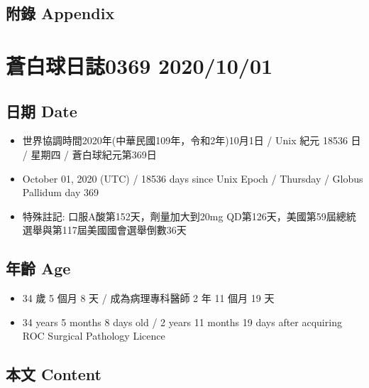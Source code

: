 \documentclass[a5paper, 11pt
]{book}
\providecommand{\tightlist}{%
  \setlength{\itemsep}{0pt}\setlength{\parskip}{0pt}}
\begin{document}
\hypertarget{ux9644ux9304-appendix-27}{%
\subsection{附錄 Appendix}\label{ux9644ux9304-appendix-27}}

\hypertarget{ux84bcux767dux7403ux65e5ux8a8c0369-20201001}{%
\section{蒼白球日誌0369
2020/10/01}\label{ux84bcux767dux7403ux65e5ux8a8c0369-20201001}}

\hypertarget{ux65e5ux671f-date-28}{%
\subsection{日期 Date}\label{ux65e5ux671f-date-28}}

\begin{itemize}
\tightlist
\item
  世界協調時間2020年(中華民國109年，令和2年)10月1日 / Unix 紀元 18536 日
  / 星期四 / 蒼白球紀元第369日
\item
  October 01, 2020 (UTC) / 18536 days since Unix Epoch / Thursday /
  Globus Pallidum day 369
\item
  特殊註記: 口服A酸第152天，劑量加大到20mg
  QD第126天，美國第59屆總統選舉與第117屆美國國會選舉倒數36天
\end{itemize}

\hypertarget{ux5e74ux9f61-age-28}{%
\subsection{年齡 Age}\label{ux5e74ux9f61-age-28}}

\begin{itemize}
\tightlist
\item
  34 歲 5 個月 8 天 / 成為病理專科醫師 2 年 11 個月 19 天
\item
  34 years 5 months 8 days old / 2 years 11 months 19 days after
  acquiring ROC Surgical Pathology Licence
\end{itemize}

\hypertarget{ux672cux6587-content-28}{%
\subsection{本文 Content}\label{ux672cux6587-content-28}}
\end{document}
